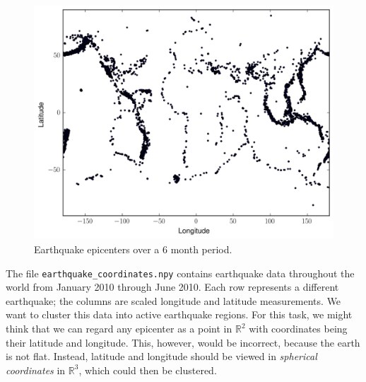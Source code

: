 \begin{figure}[H]
    \centering
    \includegraphics[width=.7\textwidth]{earthquakes.png}
    \caption{Earthquake epicenters over a 6 month period.}
    \label{fig:earthquakes}
\end{figure}

The file \texttt{earthquake\_coordinates.npy} contains earthquake data throughout the world from January 2010 through June 2010.
Each row represents a different earthquake; the columns are scaled longitude and latitude measurements.
We want to cluster this data into active earthquake regions.
For this task, we might think that we can regard any epicenter as a point in $\mathbb{R}^{2}$ with coordinates being their latitude and longitude.
This, however, would be incorrect, because the earth is not flat.
Instead, latitude and longitude should be viewed in \emph{spherical coordinates} in $\mathbb{R}^{3}$, which could then be clustered.

